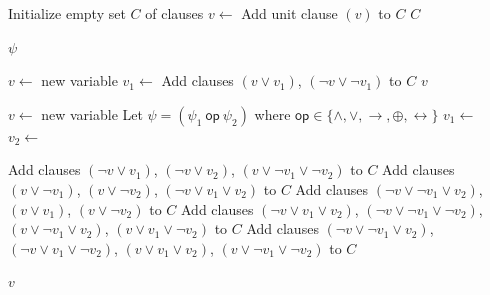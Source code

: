 \begin{algorithm}
    \caption{Tseitin Transform\cite{tseitin70}}
    \label{alg:tseitin-transform}
    \begin{algorithmic}
        \State Initialize empty set $C$ of clauses
        \State $v \gets$ 
        \State Add unit clause $(v)$ to $C$
        \State \Return $C$
        \EndProcedure

        \State \Return $\psi$
        \EndIf

        \State $v \gets$ new variable
        \State $v_1 \gets$ 
        \State Add clauses $(v \lor v_1)$, $(\neg v \lor \neg v_1)$ to $C$
        \State \Return $v$
        \EndIf

        \State $v \gets$ new variable
        \State Let $\psi = (\psi_1 \ \mathsf{op}\ \psi_2)$ where $\mathsf{op} \in \{\land,\lor,\rightarrow,\oplus,\leftrightarrow\}$
        \State $v_1 \gets$ 
        \State $v_2 \gets$ 

        \State Add clauses $(\neg v \lor v_1)$, $(\neg v \lor v_2)$, $(v \lor \neg v_1 \lor \neg v_2)$ to $C$
        \State Add clauses $(v \lor \neg v_1)$, $(v \lor \neg v_2)$, $(\neg v \lor v_1 \lor v_2)$ to $C$
        \State Add clauses $(\neg v \lor \neg v_1 \lor v_2)$, $(v \lor v_1)$, $(v \lor \neg v_2)$ to $C$
        \State Add clauses $(\neg v \lor v_1 \lor v_2)$, $(\neg v \lor \neg v_1 \lor \neg v_2)$,
        \State \hspace{1.5em} $(v \lor \neg v_1 \lor v_2)$, $(v \lor v_1 \lor \neg v_2)$ to $C$
        \State Add clauses $(\neg v \lor \neg v_1 \lor v_2)$, $(\neg v \lor v_1 \lor \neg v_2)$,
        \State \hspace{1.5em} $(v \lor v_1 \lor v_2)$, $(v \lor \neg v_1 \lor \neg v_2)$ to $C$
        \EndIf

        \State \Return $v$
        \EndProcedure
    \end{algorithmic}
\end{algorithm}
